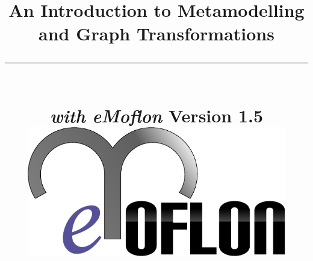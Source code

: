 \title{
\flushright
{\LARGE\bfseries An Introduction to Metamodelling\\
and Graph Transformations}
\noindent\rule[-1ex]{\textwidth}{5pt}\\[2.5ex]
\hfill\emph{\LARGE\bfseries with eMoflon}
\flushleft
{\small Version 1.5}
\flushright
\includegraphics[width=0.85\textwidth]{pics/eMoflon3} 
}

\date{}  
\author{} 